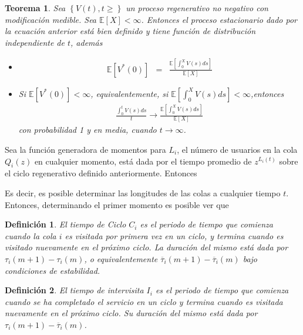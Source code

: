 \documentclass{article}
\newtheorem{Def}{Definición}
\newtheorem{Teo}{Teorema}
\newcommand{\esp}{\mathbb{E}}
\begin{document}
\begin{Teo}
Sea $\left\{V\left(t\right),t\geq\right\}$ un proceso regenerativo no negativo con modificaci\'on medible. Sea $\esp\left[X\right]<\infty$. Entonces el proceso estacionario dado por la ecuaci\'on anterior est\'a bien definido y tiene funci\'on de distribuci\'on independiente de $t$, adem\'as
\begin{itemize}
\item[i)] \begin{eqnarray*}
\esp\left[V^{*}\left(0\right)\right]&=&\frac{\esp\left[\int_{0}^{X}V\left(s\right)ds\right]}{\esp\left[X\right]}\end{eqnarray*}
\item[ii)] Si $\esp\left[V^{*}\left(0\right)\right]<\infty$, equivalentemente, si $\esp\left[\int_{0}^{X}V\left(s\right)ds\right]<\infty$,entonces
\begin{eqnarray*}
\frac{\int_{0}^{t}V\left(s\right)ds}{t}\rightarrow\frac{\esp\left[\int_{0}^{X}V\left(s\right)ds\right]}{\esp\left[X\right]}
\end{eqnarray*}
con probabilidad 1 y en media, cuando $t\rightarrow\infty$.
\end{itemize}
\end{Teo}

Sea la funci\'on generadora de momentos para $L_{i}$, el n\'umero de usuarios en la cola $Q_{i}\left(z\right)$ en cualquier momento, est\'a dada por el tiempo promedio de $z^{L_{i}\left(t\right)}$ sobre el ciclo regenerativo definido anteriormente. Entonces 



Es decir, es posible determinar las longitudes de las colas a cualquier tiempo $t$. Entonces, determinando el primer momento es posible ver que


\begin{Def}
El tiempo de Ciclo $C_{i}$ es el periodo de tiempo que comienza cuando la cola $i$ es visitada por primera vez en un ciclo, y termina cuando es visitado nuevamente en el pr\'oximo ciclo. La duraci\'on del mismo est\'a dada por $\tau_{i}\left(m+1\right)-\tau_{i}\left(m\right)$, o equivalentemente $\overline{\tau}_{i}\left(m+1\right)-\overline{\tau}_{i}\left(m\right)$ bajo condiciones de estabilidad.
\end{Def}


\begin{Def}
El tiempo de intervisita $I_{i}$ es el periodo de tiempo que comienza cuando se ha completado el servicio en un ciclo y termina cuando es visitada nuevamente en el pr\'oximo ciclo. Su  duraci\'on del mismo est\'a dada por $\tau_{i}\left(m+1\right)-\overline{\tau}_{i}\left(m\right)$.
\end{Def}
\end{document}
